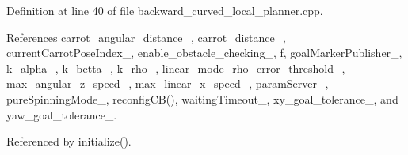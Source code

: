 Definition at line 40 of file backward\+\_\+curved\+\_\+local\+\_\+planner.\+cpp.



References carrot\+\_\+angular\+\_\+distance\+\_\+, carrot\+\_\+distance\+\_\+, current\+Carrot\+Pose\+Index\+\_\+, enable\+\_\+obstacle\+\_\+checking\+\_\+, f, goal\+Marker\+Publisher\+\_\+, k\+\_\+alpha\+\_\+, k\+\_\+betta\+\_\+, k\+\_\+rho\+\_\+, linear\+\_\+mode\+\_\+rho\+\_\+error\+\_\+threshold\+\_\+, max\+\_\+angular\+\_\+z\+\_\+speed\+\_\+, max\+\_\+linear\+\_\+x\+\_\+speed\+\_\+, param\+Server\+\_\+, pure\+Spinning\+Mode\+\_\+, reconfig\+C\+B(), waiting\+Timeout\+\_\+, xy\+\_\+goal\+\_\+tolerance\+\_\+, and yaw\+\_\+goal\+\_\+tolerance\+\_\+.



Referenced by initialize().


